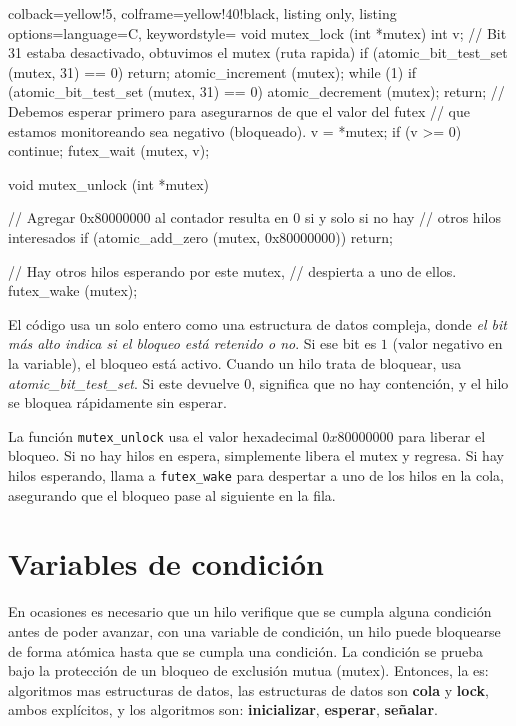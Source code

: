 \documentclass[openany]{book}
\begin{document}
\begin{tcblisting}{colback=yellow!5, colframe=yellow!40!black, listing only, listing options={language=C, keywordstyle=\color{blue!35!white}\bfseries}}
void mutex_lock (int *mutex) {
    int v;
    // Bit 31 estaba desactivado, obtuvimos el mutex (ruta rapida)
    if (atomic_bit_test_set (mutex, 31) == 0)
        return;
    atomic_increment (mutex);
    while (1) {
        if (atomic_bit_test_set (mutex, 31) == 0) {
            atomic_decrement (mutex);
            return;
        }
        // Debemos esperar primero para asegurarnos de que el valor del futex
        // que estamos monitoreando sea negativo (bloqueado).
        v = *mutex;
        if (v >= 0)
            continue;
        futex_wait (mutex, v);
    }
}

void mutex_unlock (int *mutex) {
    // Agregar 0x80000000 al contador resulta en 0 si y solo si no hay 
    // otros hilos interesados
    if (atomic_add_zero (mutex, 0x80000000))
        return;
    
    // Hay otros hilos esperando por este mutex,
    // despierta a uno de ellos.
    futex_wake (mutex);
}
\end{tcblisting}    
El código usa un solo entero como una estructura de datos compleja, donde \textit{el bit más alto indica si el bloqueo está retenido o no}. Si ese bit es $1$ (valor negativo en la variable), el bloqueo está activo. Cuando un hilo trata de bloquear, usa \textit{atomic\_bit\_test\_set}. Si este devuelve $0$, significa que no hay contención, y el hilo se bloquea rápidamente sin esperar.

La función \texttt{mutex\_unlock} usa el valor hexadecimal $0x80000000$ para liberar el bloqueo. Si no hay hilos en espera, simplemente libera el mutex y regresa. Si hay hilos esperando, llama a \texttt{futex\_wake} para despertar a uno de los hilos en la cola, asegurando que el bloqueo pase al siguiente en la fila.

\section{Variables de condición}\label{sec:condvar}
En ocasiones es necesario que un hilo verifique que se cumpla alguna condición antes de poder avanzar, con una variable de condición, un hilo puede bloquearse de forma atómica hasta que se cumpla una condición. La condición se prueba bajo la protección de un bloqueo de exclusión mutua (mutex).
Entonces, la  es: algoritmos mas estructuras de datos, las estructuras de datos son \textbf{cola} y \textbf{lock}, ambos explícitos, y los algoritmos son: \textbf{inicializar}, \textbf{esperar}, \textbf{señalar}. 
\end{document}
